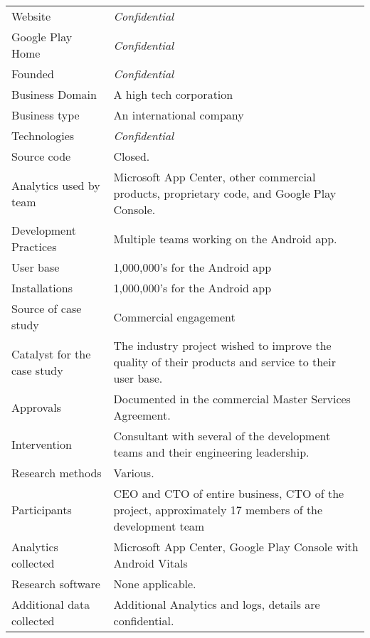 \begin{table*}[h]
    \centering
    \renewcommand{\arraystretch}{0.8}%
    \small
    \setlength{\tabcolsep}{6pt}
    \begin{tabular}{lp{9cm}}
       \toprule
       Website &\textit{Confidential} \\
       Google Play Home & \textit{Confidential} \\
       Founded & \textit{Confidential} \\
       Business Domain & A high tech corporation \\
       Business type & An international company \\
       Technologies  & \textit{Confidential} \\
       Source code  &Closed. \\
       Analytics used by team & Microsoft App Center, other commercial products, proprietary code, and Google Play Console. \\
       Development Practices & Multiple teams working on the Android app. \\
       \arrayrulecolor{blue!20}\midrule
       User base & 1,000,000's for the Android app \\
       Installations & 1,000,000's for the Android app \\
       \arrayrulecolor{blue!20}\midrule
       Source of case study &Commercial engagement \\
       Catalyst for the case study &The industry project wished to improve the quality of their products and service to their user base. \\
       Approvals &Documented in the commercial Master Services Agreement. \\
       \arrayrulecolor{blue!20}\midrule
       Intervention &Consultant with several of the development teams and their engineering leadership. \\
       Research methods &Various. \\
       Participants &CEO and CTO of entire business, CTO of the project, approximately 17 members of the development team \\
       Analytics collected &Microsoft App Center, Google Play Console with Android Vitals \\
       Research software & None applicable. \\
       Additional data collected &Additional Analytics and logs, details are confidential. \\

\end{tabular}
\end{table*}
